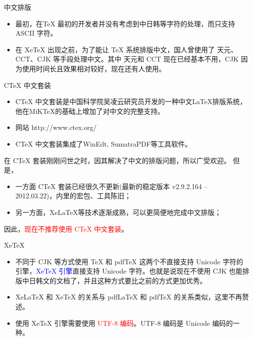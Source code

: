 \documentclass[13pt]{ctexbeamer}
\newcommand{\red}[1]{\textcolor{red}{#1}}
\newcommand{\blue}[1]{\textcolor{blue}{#1}}
\begin{document}
\begin{frame}{中文排版}
\begin{itemize}
    \item 最初，在TeX 最初的开发者并没有考虑到中日韩等字符的处理，而只支持 ASCII 字符。
    \item 在 XeTeX 出现之前，为了能让 TeX 系统排版中文，国人曾使用了 天元、CCT、CJK 等手段处理中文。其中 天元和 CCT 现在已经基本不用，CJK 因为使用时间长且效果相对较好，现在还有人使用。

    \end{itemize}
\end{frame}
    



\begin{frame}{CTeX 中文套装}
	
	
	\begin{itemize}
		\item 
		CTeX 中文套装是中国科学院吴凌云研究员开发的一种中文LaTeX排版系统，他在MiKTeX的基础上增加了对中文的完整支持。
		\item 
		网站  http://www.ctex.org/
		
		\item CTeX 中文套装集成了WinEdt, SumatraPDF等工具软件。
	\end{itemize}
	在 CTeX 套装刚刚问世之时，因其解决了中文的排版问题，所以广受欢迎。 但是，
	\begin{itemize}
		\item  一方面 CTeX 套装已经很久不更新(最新的稳定版本	v2.9.2.164 -- 2012.03.22)，内里的宏包、工具陈旧；
		\item 另一方面，XeLaTeX等技术逐渐成熟，可以更简便地完成中文排版；
	\end{itemize}
	
	因此，\red{现在不推荐使用 CTeX 中文套装}。
	
\end{frame}


\begin{frame}{XeTeX}
	
	\begin{itemize}
		\item 不同于 CJK 等方式使用 TeX 和 pdfTeX 这两个不直接支持 Unicode 字符的引擎，\blue{XeTeX 引擎}直接支持 Unicode 字符。也就是说现在不使用 CJK 也能排版中日韩文的文档了，并且这种方式要比之前的方式更加优秀。
		
		\item XeLaTeX 和 XeTeX 的关系与 pdfLaTeX 和 pdfTeX 的关系类似，这里不再赘述。
		
		\item  使用 XeTeX 引擎需要使用 \red{UTF-8 编码}。{UTF-8 编码}是 Unicode 编码的一种。
	\end{itemize}
\end{frame}
\end{document}
